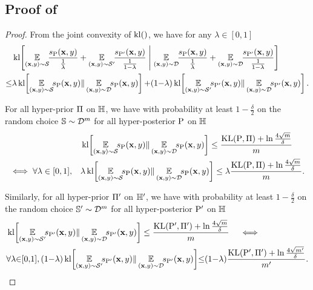 \begin{noaddcontents}
\section{Proof of }
\label{chap:mv-sto:sec:proof-theorem-bound-data}

\theorembounddata*
\begin{proof}
From the joint convexity of $\operatorname{kl}()$, we have for any $\lambda \in [0, 1]$
\begin{align*}
    &\kl\!\LB \EE_{(\x,\y)\sim\dS}\!\!\frac{s_{\hyperQ}(\x, \y)}{\tfrac{1}{\lambda}}+\EE_{(\x,\y)\sim\dSp}\!\!\frac{s_{\hyperQp}(\x, \y)}{\tfrac{1}{1{-}\lambda}} \;\middle|\; \EE_{(\x,\y)\sim\D}\!\!\frac{s_{\hyperQ}(\x, \y)}{\tfrac{1}{\lambda}}+\EE_{(\x,\y)\sim\D}\!\!\frac{s_{\hyperQp}(\x, \y)}{\tfrac{1}{1{-}\lambda}}\RB\\
    \le &\lambda\kl\!\LB \EE_{(\x,\y)\sim\dS}\!\!s_{\hyperQ}(\x, \y) \| \EE_{(\x,\y)\sim\D}\!\!s_{\hyperQ}(\x, \y) \RB{+}(1{-}\lambda)\kl\!\LB \EE_{(\x,\y)\sim\dSp}\!\!s_{\hyperQp}(\x, \y) \| \EE_{(\x,\y)\sim\D}\!\!s_{\hyperQp}(\x, \y) \RB.
\end{align*}

For all hyper-prior $\Pi$ on $\mathbb{H}$, we have with probability at least $1-\frac{\delta}{2}$ on the random choice $\mathbb{S}\sim\mathcal{D}^{m}$ for all hyper-posterior $\mathrm{P}$ on $\mathbb{H}$
\begin{align}
&\kl\!\LB \EE_{(\x,\y)\sim\dS}\!\!s_{\hyperQ}(\x, \y) \| \EE_{(\x,\y)\sim\D}\!\!s_{\hyperQ}(\x, \y) \RB \le \frac{\KL(\hyperQ, \hyperP)+\ln\tfrac{4\sqrt{\m}}{\delta}}{\m}\nonumber\\
\iff \forall \lambda\in[0, 1],\quad &\lambda\kl\!\LB \EE_{(\x,\y)\sim\dS}\!\!s_{\hyperQ}(\x, \y) \| \EE_{(\x,\y)\sim\D}\!\!s_{\hyperQ}(\x, \y) \RB \le \lambda\frac{\KL(\hyperQ, \hyperP)+\ln\tfrac{4\sqrt{\m}}{\delta}}{\m}.\label{chap:mv-sto:eq:data-seeger-bound-proof-1}
\end{align}

Similarly, for all hyper-prior $\Pi'$ on $\mathbb{H}'$, we have with probability at least $1-\frac{\delta}{2}$ on the random choice $\mathbb{S}'\sim\mathcal{D}^{m}$ for all hyper-posterior $\mathrm{P}'$ on $\mathbb{H}$
\begin{align}
&\kl\!\LB \EE_{(\x,\y)\sim\dSp}\!\!s_{\hyperQp}(\x, \y) \| \EE_{(\x,\y)\sim\D}\!\!s_{\hyperQp}(\x, \y) \RB \le \frac{\KL(\hyperQp, \hyperPp)+\ln\tfrac{4\sqrt{\m}}{\delta}}{\m}\nonumber \quad\iff\quad \\
&\forall \lambda{\in}[0{,}1], (1{-}\lambda)\kl\!\LB \EE_{(\x,\y)\sim\dSp}\!\!s_{\hyperQp}(\x, \y) \| \EE_{(\x,\y)\sim\D}\!\!s_{\hyperQp}(\x, \y) \RB \!{\le} (1{-}\lambda)\frac{\KL(\hyperQp, \hyperPp)+\ln\tfrac{4\sqrt{\mp}}{\delta}}{\mp}.\label{chap:mv-sto:eq:data-seeger-bound-proof-2}
\end{align}


\end{proof}
\end{noaddcontents}
